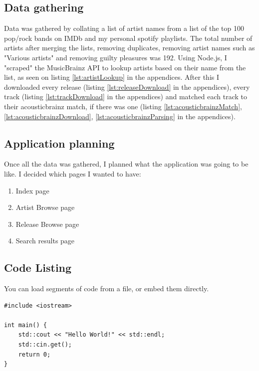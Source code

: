 \documentclass[10pt, a4paper]{article}
\begin{document}
	\subsection{Data gathering}
	Data was gathered by collating a list of artist names from a list of the top 100 pop/rock bands on IMDb\cite{imdb} and my personal spotify playlists.
	The total number of artists after merging the lists, removing duplicates, removing artist names such as "Various artists" and removing guilty pleasures was 192.
	Using Node.js\cite{nodejs}, I "scraped" the MusicBrainz API to lookup artists based on their name from the list, as seen on listing \ref{lst:artistLookup} in the appendices.
	After this I downloaded every release (listing \ref{lst:releaseDownload} in the appendices), every track (listing \ref{lst:trackDownload} in the appendices) and matched each track to their acousticbrainz match, if there was one (listing \ref{lst:acousticbrainzMatch}, \ref{lst:acousticbrainzDownload}, \ref{lst:acousticbrainzParsing} in the appendices).
    
    
	\subsection{Application planning}
	Once all the data was gathered, I planned what the application was going to be like. I decided which pages I wanted to have:
	\begin{enumerate}
	\item Index page
	\item Artist Browse page
	\item Release Browse page
	\item Search results page
	\end{enumerate}
    

	
	\subsection{Code Listing}
    You can load segments of code from a file, or embed them directly.
    
\begin{lstlisting}[caption = Hello World! in c++]
#include <iostream>

int main() {
    std::cout << "Hello World!" << std::endl;
    std::cin.get();
    return 0;
}
\end{lstlisting}


    
\end{document}
